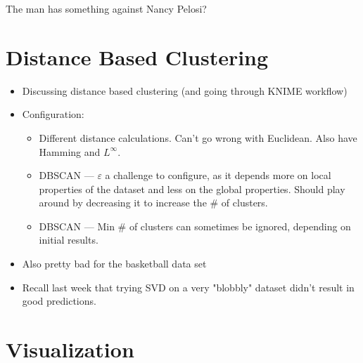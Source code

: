 
The man has something against Nancy Pelosi?

\section{Distance Based Clustering}

\begin{itemize}
  \item Discussing distance based clustering (and going through KNIME workflow)
  \item Configuration:
        \begin{itemize}
          \item Different distance calculations. Can't go wrong with Euclidean. Also have Hamming and \(L^{\infty}\).
          \item DBSCAN --- \(\varepsilon\) a challenge to configure, as it depends more on local properties of the dataset and less on the global properties. Should play around by decreasing it to increase the \# of clusters.
          \item DBSCAN --- Min \# of clusters can sometimes be ignored, depending on initial results.
        \end{itemize}
  \item Also pretty bad for the basketball data set
  \item Recall last week that trying SVD on a very "blobbly" dataset didn't result in good predictions.
\end{itemize}

\section{Visualization}

